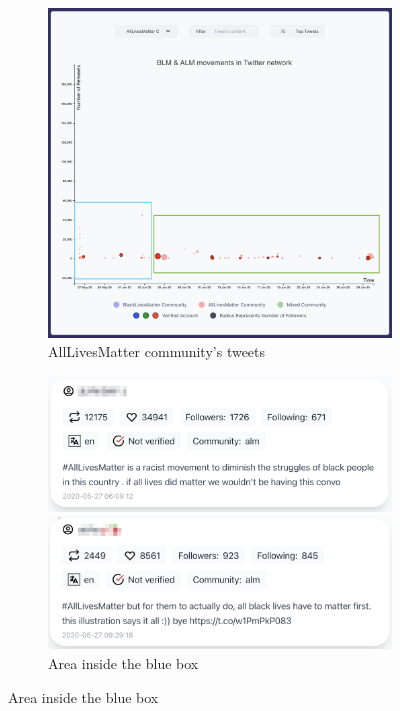 \begin{figure}[H]

\begin{subfigure}{.5\textwidth}
  \centering
  \captionsetup{justification=centering}
  \includegraphics[width=1\linewidth]{Report-latex/tex_files/pics/example/obser1.png}  
  \caption{AllLivesMatter community's tweets}
  \label{fig:sub-second}
\end{subfigure}
\begin{subfigure}{.5\textwidth}
  \centering
  \captionsetup{justification=centering}
  \includegraphics[width=1\linewidth]{Report-latex/tex_files/pics/example/obser2.png}
  
  
  \includegraphics[width=1\linewidth]{Report-latex/tex_files/pics/example/obser3.png}
  \caption{Area inside the blue box}
  \label{fig:sub-second}
\end{subfigure}


\end{figure}
